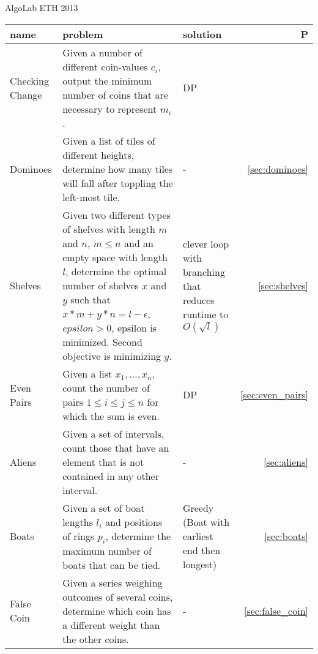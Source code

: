 \documentclass[a4paper, 10pt]{article}
\begin{document}
    \vspace*{1cm}
    \begin{center}
        {\huge AlgoLab ETH 2013}
    \end{center}
    \vspace{1cm}
    \begin{longtable}{ L{2cm} L{7cm} L{3cm} r}
        name & problem & solution & P\\
      \hline
        Checking Change 
        & Given a number of different coin-values $c_i$, 
            output the minimum number of coins that are necessary to represent $m_i$.
        & DP       & \pageref{sec:checking_change} \\

        Dominoes 
        & Given a list of tiles of different heights, determine how many tiles will
            fall after toppling the left-most tile.
        & - &  \ref{sec:dominoes} \\

        Shelves 
        & Given two different types of shelves with length $m$ and $n$, $m\leq n$ and an empty space with length $l$,
            determine the optimal number of shelves $x$ and $y$ such that $x*m + y*n = l-\epsilon$, $epsilon>0$,
            epsilon is minimized. Second objective is minimizing $y$.
        & clever loop with branching that reduces runtime to $O(\sqrt{l})$ &  \ref{sec:shelves} \\

        Even Pairs 
        & Given a list $x_1,\dots,x_n$, count the number of pairs $1\leq i\leq j \leq n$ for which 
            the sum is even.
        & DP &  \ref{sec:even_pairs} \\

        Aliens
        & Given a set of intervals, count those that have an element that is not contained in any other interval. 
        & - &  \ref{sec:aliens} \\

        Boats 
        & Given a set of boat lengths $l_i$ and positions of rings $p_i$, determine the maximum number of boats that can be tied.
        & Greedy (Boat with earliest end then longest) &  \ref{sec:boats} \\

        False Coin 
        & Given a series weighing outcomes of several coins, determine which coin has a different weight than the other coins. 
        & - &  \ref{sec:false_coin} \\


\end{longtable}
\end{document}

